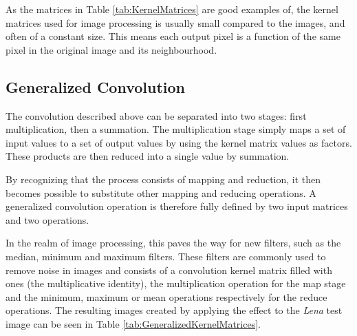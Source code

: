 As the matrices in Table \ref{tab:KernelMatrices} are good examples of, the kernel matrices used for image processing is usually small compared to the images, and often of a constant size.
This means each output pixel is a function of the same pixel in the original image and its neighbourhood.

\subsection{Generalized Convolution}
The convolution described above can be separated into two stages: first multiplication, then a summation.
The multiplication stage simply maps a set of input values to a set of output values by using the kernel matrix values as factors.
These products are then reduced into a single value by summation.

By recognizing that the process consists of mapping and reduction,
it then becomes possible to substitute other mapping and reducing operations.
A generalized convolution operation is therefore fully defined by two input matrices and two operations.

In the realm of image processing, this paves the way for new filters, such as the median, minimum and maximum filters.
These filters are commonly used to remove noise in images and consists of a convolution kernel matrix filled with ones (the multiplicative identity),
the multiplication operation for the map stage
and the minimum, maximum or mean operations respectively for the reduce operations.
The resulting images created by applying the effect to the \textit{Lena} test image can be seen in Table \ref{tab:GeneralizedKernelMatrices}.

